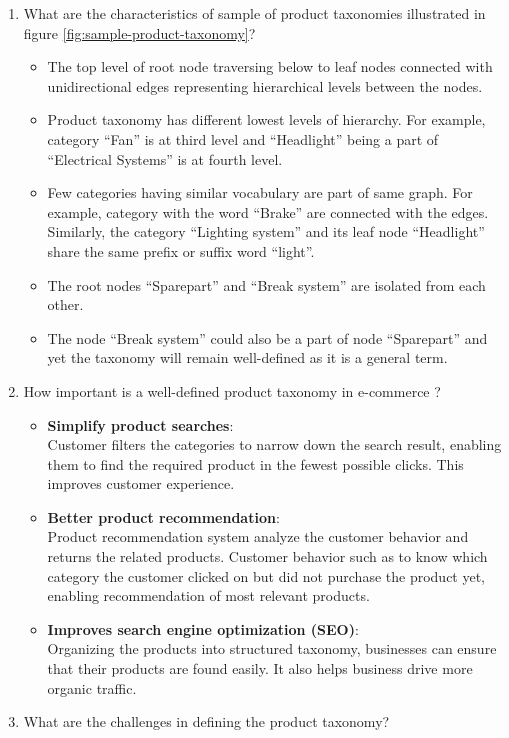 \begin{enumerate}[label=\textbf{Q\arabic*:}]
    \item What are the characteristics of sample of product taxonomies illustrated in figure \ref{fig:sample-product-taxonomy}?
    

    \begin{itemize}
        \item The top level of root node traversing below to leaf nodes connected with unidirectional edges representing hierarchical levels between the nodes. 
        \item Product taxonomy has different lowest levels of hierarchy. For example, category ``Fan'' is at third level and ``Headlight'' being a part of ``Electrical Systems'' is at fourth level.
        \item Few categories having similar vocabulary are part of same graph. For example, category with the word ``Brake'' are connected with the edges.  Similarly, the category ``Lighting system'' and its leaf node ``Headlight'' share the same prefix or suffix word ``light''.
        \item The root nodes ``Sparepart'' and ``Break system'' are isolated from each other.  
        \item The node ``Break system'' could also be a part of node ``Sparepart'' and yet the taxonomy will remain well-defined as it is a general term.
        
    \end{itemize}
    \item How important is a well-defined product taxonomy in e-commerce \parencite{JessicaHoward.}?
    \begin{itemize}
        \item \textbf{Simplify product searches}:\\ Customer filters the categories to narrow down the search result, enabling them to find the required product in the fewest possible clicks. This improves customer experience.
        \item \textbf{Better product recommendation}:\\ Product recommendation system analyze the customer behavior and returns the related products. Customer behavior such as to know which category the customer clicked on but did not purchase the product yet, enabling recommendation of most relevant products. 
        \item \textbf{Improves search engine optimization (SEO)}:\\  Organizing the products into structured taxonomy, businesses can ensure that their products are found easily. It also helps business drive more organic traffic. 
    \end{itemize}
    \item What are the challenges in defining the product taxonomy? \parencite{JessicaHoward.}
    


\end{enumerate}
